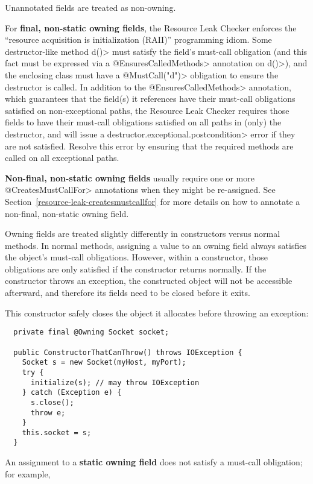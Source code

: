 
Unannotated fields are treated as non-owning.

For \textbf{final, non-static owning fields},
the Resource Leak Checker enforces the ``resource acquisition is
initialization (RAII)'' programming idiom.  Some
destructor-like method \<d()> must satisfy the field's must-call obligation
(and this fact must be expressed via a \<@EnsuresCalledMethods> annotation on \<d()>),
and the enclosing class must have a \<@MustCall("d")> obligation to
ensure the destructor is called. In addition to the \<@EnsuresCalledMethods> annotation,
which guarantees that the field(s) it references have their must-call obligations satisfied
on non-exceptional paths, the Resource Leak Checker requires those fields to have their must-call
obligations satisfied on all paths in (only) the destructor, and will issue a \<destructor.exceptional.postcondition>
error if they are not satisfied. Resolve this error by ensuring that the required methods are called
on all exceptional paths.

\textbf{Non-final, non-static owning fields} usually require one or more \<@CreatesMustCallFor> annotations
when they might be re-assigned. See Section~\ref{resource-leak-createsmustcallfor} for
more details on how to annotate a non-final, non-static owning field.

Owning fields are treated slightly differently in constructors versus normal methods.
In normal methods, assigning a value to an owning field always satisfies the object's
must-call obligations.  However, within a constructor, those obligations are only
satisfied if the constructor returns normally.  If the constructor throws an exception,
the constructed object will not be accessible afterward, and therefore its fields need
to be closed before it exits.

This constructor safely closes the object it allocates before throwing an exception:
\begin{verbatim}
  private final @Owning Socket socket;

  public ConstructorThatCanThrow() throws IOException {
    Socket s = new Socket(myHost, myPort);
    try {
      initialize(s); // may throw IOException
    } catch (Exception e) {
      s.close();
      throw e;
    }
    this.socket = s;
  }
\end{verbatim}

An assignment to a \textbf{static owning field} does not satisfy a
must-call obligation; for example,

